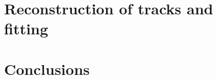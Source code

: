 \documentclass[12pt,a4paper,twoside]{book}
\begin{document}
\chapter{Reconstruction of tracks and fitting}

\chapter*{Conclusions}

\fancyhf{}
\fancyhead[LE]{\thepage}%
\fancyhead[RO]{\thepage}%
\fancyhead[RE]{\nouppercase{\rightmark}}%
\fancyfoot{}
\printbibliography[heading=bibintoc]
\end{document}
